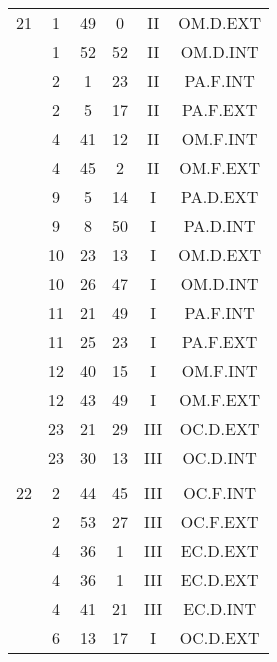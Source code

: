 \documentclass[12pt, a4paper]{article}
\begin{document}
\begin{multicols}{3}
{\begin{tabular}{c c c c c c}
	 	 	 	21 & 1 & 49 & 0 & II & OM.D.EXT\\%
	 	 	 	 & 1 & 52 & 52 & II & OM.D.INT\\%
	 	 	 	 & 2 & 1 & 23 & II & PA.F.INT\\%
	 	 	 	 & 2 & 5 & 17 & II & PA.F.EXT\\%
	 	 	 	 & 4 & 41 & 12 & II & OM.F.INT\\%
	 	 	 	 & 4 & 45 & 2 & II & OM.F.EXT\\%
	 	 	 	 & 9 & 5 & 14 & I & PA.D.EXT\\%
	 	 	 	 & 9 & 8 & 50 & I & PA.D.INT\\%
	 	 	 	 & 10 & 23 & 13 & I & OM.D.EXT\\%
	 	 	 	 & 10 & 26 & 47 & I & OM.D.INT\\%
	 	 	 	 & 11 & 21 & 49 & I & PA.F.INT\\%
	 	 	 	 & 11 & 25 & 23 & I & PA.F.EXT\\%
	 	 	 	 & 12 & 40 & 15 & I & OM.F.INT\\%
	 	 	 	 & 12 & 43 & 49 & I & OM.F.EXT\\%
	 	 	 	 & 23 & 21 & 29 & III & OC.D.EXT\\%
	 	 	 	 & 23 & 30 & 13 & III & OC.D.INT\\%
	 	 	 	 & & & & & \\%
	 	 	 	22 & 2 & 44 & 45 & III & OC.F.INT\\%
	 	 	 	 & 2 & 53 & 27 & III & OC.F.EXT\\%
	 	 	 	 & 4 & 36 & 1 & III & EC.D.EXT\\%
	 	 	 	 & 4 & 36 & 1 & III & EC.D.EXT\\%
	 	 	 	 & 4 & 41 & 21 & III & EC.D.INT\\%
	 	 	 	 & 6 & 13 & 17 & I & OC.D.EXT\\%

\end{tabular}}
\end{multicols}
\end{document}
